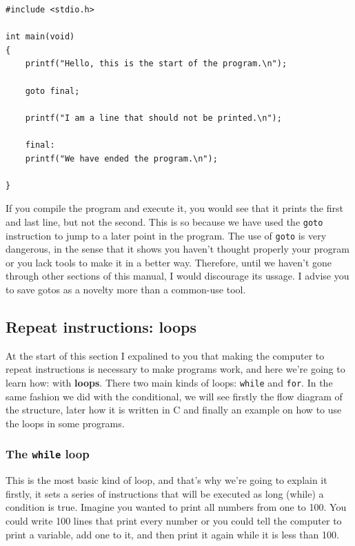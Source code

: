 \documentclass[a4paper]{article}
\begin{document}
\noindent
\begin{minipage}[H]{\linewidth}
\mbox{}
\begin{lstlisting}[style=C,
caption={Example of a program with \texttt{goto}},
label={lst:gotoExample}]
#include <stdio.h>

int main(void)
{
    printf("Hello, this is the start of the program.\n");

    goto final;

    printf("I am a line that should not be printed.\n");

    final:
    printf("We have ended the program.\n");

}
\end{lstlisting}
\end{minipage}
If you compile the program and execute it, you would see that it prints the
first and last line, but not the second. This is so because we have used the
\texttt{goto} instruction to jump to a later point in the program. The use
of \texttt{goto} is very dangerous, in the sense that it shows you haven't
thought properly your program or you lack tools to make it in a better way.
Therefore, until we haven't gone through other sections of this manual, I
would discourage its ussage. I advise you to save gotos as a novelty more
than a common-use tool.

\subsection{Repeat instructions: loops}
At the start of this section I expalined to you that making the computer to
repeat instructions is necessary to make programs work, and here we're going
to learn how: with \textbf{loops}. There two main kinds of loops:
\lstinline[style=C]!while! and \lstinline[style=C]!for!.
In the same fashion we did with the conditional, we will see firstly the flow
diagram of the structure, later how it is written in C and finally an example on
how to use the loops in some programs.

\subsubsection{The \texttt{while} loop}
This is the most basic kind of loop, and that's why we're going to explain it
firstly, it sets a series of instructions that will be executed as long
(while) a condition is true. Imagine you wanted to print all numbers from
one to 100. You could write 100 lines that print every number or you could
tell the computer to print a variable, add one to it, and then print it again
while it is less than 100.
\end{document}
